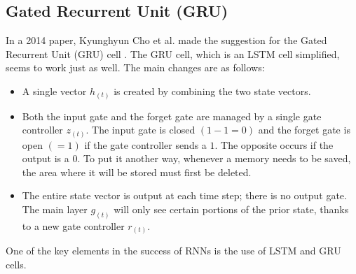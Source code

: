 \subsection{Gated Recurrent Unit (GRU)}
In a 2014 paper, Kyunghyun Cho et al. made the suggestion for the Gated Recurrent Unit (GRU) cell \parencite{cho2014learning}.
The GRU cell, which is an LSTM cell simplified, seems to work just as well. The main changes are as follows:

\begin{itemize}
    \item A single vector $h_{(t)}$ is created by combining the two state vectors.
    \item Both the input gate and the forget gate are managed by a single gate controller $z_{(t)}$. The input gate is closed $(1-1 = 0)$ and the forget gate is open $(= 1)$ if the gate controller sends a $1$. The opposite occurs if the output is a $0$. To put it another way, whenever a memory needs to be saved, the area where it will be stored must first be deleted.
    \item The entire state vector is output at each time step; there is no output gate. The main layer $g_{(t)}$ will only see certain portions of the prior state, thanks to a new gate controller $r_{(t)}$.
\end{itemize}

One of the key elements in the success of RNNs is the use of LSTM and GRU cells.

